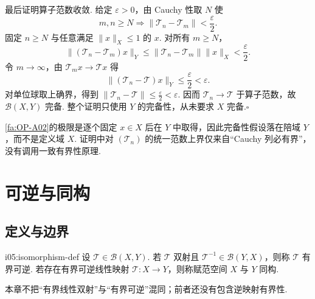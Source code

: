 \begin{FAProof}
最后证明算子范数收敛. 给定 \(\displaystyle \varepsilon>0\)，由 Cauchy 性取 \(\displaystyle N\) 使
\[
m,n\geqslant N
\Longrightarrow
\|\mathcal T_n-\mathcal T_m\|<\frac{\varepsilon}{2}.
\]
固定 \(\displaystyle n\geqslant N\) 与任意满足 \(\displaystyle \|x\|_X\leqslant1\) 的 \(\displaystyle x\). 对所有 \(\displaystyle m\geqslant N\)，
\[
\|(\mathcal T_n-\mathcal T_m)x\|_Y
\leqslant\|\mathcal T_n-\mathcal T_m\|\|x\|_X
<\frac{\varepsilon}{2}.
\]
令 \(\displaystyle m\to\infty\)，由 \(\displaystyle \mathcal T_mx\to\mathcal T x\) 得
\[
\|(\mathcal T_n-\mathcal T)x\|_Y
\leqslant\frac{\varepsilon}{2}
<\varepsilon.
\]
对单位球取上确界，得到 \(\displaystyle \|\mathcal T_n-\mathcal T\|\leqslant\frac{\varepsilon}{2}<\varepsilon\). 因而 \(\displaystyle \mathcal T_n\to\mathcal T\) 于算子范数，故 \(\displaystyle \mathcal B(X,Y)\) 完备. 整个证明只使用 \(\displaystyle Y\) 的完备性，从未要求 \(\displaystyle X\) 完备.\hfill\(\square\)
\end{FAProof}

\begin{FARemark}[定义域完备性不需要]
\autoref{fa:OP-A02}的极限是逐个固定 \(\displaystyle x\in X\) 后在 \(\displaystyle Y\) 中取得，因此完备性假设落在陪域 \(\displaystyle Y\)，而不是定义域 \(\displaystyle X\). 证明中对 \(\displaystyle (\mathcal T_n)\) 的统一范数上界仅来自“Cauchy 列必有界”，没有调用一致有界性原理.
\end{FARemark}

\section{可逆与同构}\label{sec:i05-invertibility-isomorphism}

\subsection{定义与边界}

\begin{FADefinition}[B][有界可逆与赋范空间同构]{i05:isomorphism-def}
设 \(\displaystyle \mathcal T\in\mathcal B(X,Y)\). 若 \(\displaystyle \mathcal T\) 双射且 \(\displaystyle \mathcal T^{-1}\in\mathcal B(Y,X)\)，则称 \(\displaystyle \mathcal T\) 有界可逆. 若存在有界可逆线性映射 \(\displaystyle \mathcal T:X\to Y\)，则称赋范空间 \(\displaystyle X\) 与 \(\displaystyle Y\) 同构.
\end{FADefinition}

本章不把“有界线性双射”与“有界可逆”混同；前者还没有包含逆映射有界性.

